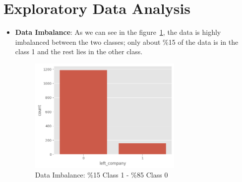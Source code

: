\documentclass[a4paper,12pt]{article}
\begin{document}
\section{Exploratory Data Analysis}
\begin{itemize}
    \item \textbf{Data Imbalance}: As we can see in the figure~\ref{fig:fig_1}, the data is highly imbalanced between the two classes; only about \%15 of the data is in the class 1 and the rest lies in the other class.
    \begin{figure}[H]
    \centering
    \includegraphics[width=0.7\textwidth]{./images/data_imbalance.png}
    \caption{Data Imbalance: \%15 Class 1 - \%85 Class 0}
    \label{fig:fig_1}
    \end{figure}


\end{itemize}
\end{document}
